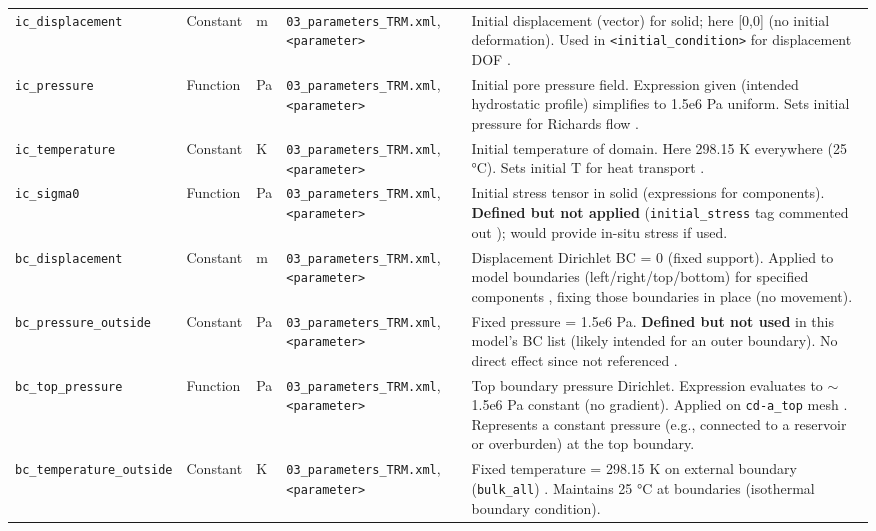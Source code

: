 \documentclass[10pt,a4paper]{article}
\begin{document}
\begin{longtable}{P{4cm} P{1.9cm} P{0.9cm} P{4cm} P{6cm}}
\texttt{ic\_displacement} & Constant & m & \texttt{03\_parameters\_TRM.xml}, \texttt{<parameter>} \cite{file:03_parameters_TRM} & Initial displacement (vector) for solid; here [0,0] (no initial deformation). Used in \texttt{<initial\_condition>} for displacement DOF \cite{file:02_process_variables_TRM}. \\
\texttt{ic\_pressure} & Function & Pa & \texttt{03\_parameters\_TRM.xml}, \texttt{<parameter>} \cite{file:03_parameters_TRM} & Initial pore pressure field. Expression given (intended hydrostatic profile) simplifies to 1.5e6 Pa uniform. Sets initial pressure for Richards flow \cite{file:02_process_variables_TRM}. \\
\texttt{ic\_temperature} & Constant & K & \texttt{03\_parameters\_TRM.xml}, \texttt{<parameter>} \cite{file:03_parameters_TRM} & Initial temperature of domain. Here 298.15 K everywhere (25 °C). Sets initial T for heat transport \cite{file:02_process_variables_TRM}. \\
\texttt{ic\_sigma0} & Function & Pa & \texttt{03\_parameters\_TRM.xml}, \texttt{<parameter>} \cite{file:03_parameters_TRM} & Initial stress tensor in solid (expressions for components). \textbf{Defined but not applied} (\texttt{initial\_stress} tag commented out \cite{file:01_processes_TRM}); would provide in-situ stress if used. \\
\texttt{bc\_displacement} & Constant & m & \texttt{03\_parameters\_TRM.xml}, \texttt{<parameter>} \cite{file:03_parameters_TRM} & Displacement Dirichlet BC = 0 (fixed support). Applied to model boundaries (left/right/top/bottom) for specified components \cite{file:02_process_variables_TRM}, fixing those boundaries in place (no movement). \\
\texttt{bc\_pressure\_outside} & Constant & Pa & \texttt{03\_parameters\_TRM.xml}, \texttt{<parameter>} \cite{file:03_parameters_TRM} & Fixed pressure = 1.5e6 Pa. \textbf{Defined but not used} in this model's BC list (likely intended for an outer boundary). No direct effect since not referenced \cite{file:trm_proc_var_bc}. \\
\texttt{bc\_top\_pressure} & Function & Pa & \texttt{03\_parameters\_TRM.xml}, \texttt{<parameter>} \cite{file:03_parameters_TRM} & Top boundary pressure Dirichlet. Expression evaluates to $\sim$1.5e6 Pa constant (no gradient). Applied on \texttt{cd-a\_top} mesh \cite{file:02_process_variables_TRM}. Represents a constant pressure (e.g., connected to a reservoir or overburden) at the top boundary. \\
\texttt{bc\_temperature\_outside} & Constant & K & \texttt{03\_parameters\_TRM.xml}, \texttt{<parameter>} \cite{file:03_parameters_TRM} & Fixed temperature = 298.15 K on external boundary (\texttt{bulk\_all}) \cite{file:trm_proc_var_bc}. Maintains 25 °C at boundaries (isothermal boundary condition). \\

\end{longtable}
\end{document}
